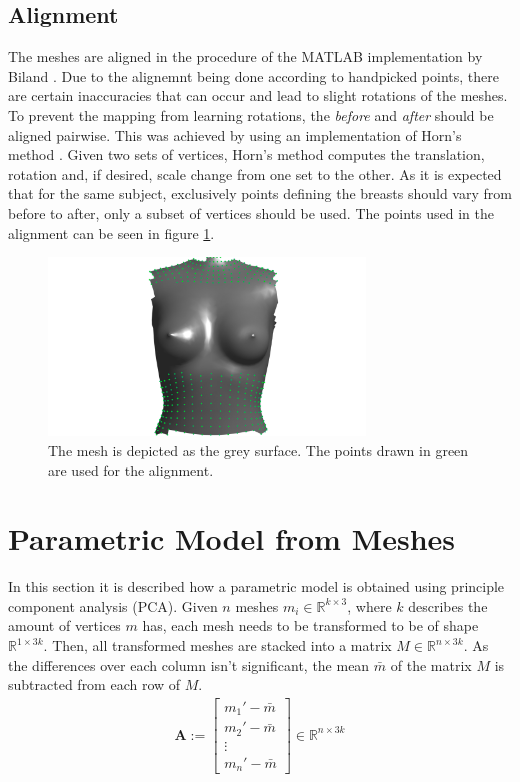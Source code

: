 \subsection{Alignment}
\label{align}
The meshes are aligned in the procedure of the MATLAB implementation by Biland \cite{Biland17}. Due to the alignemnt being done according to handpicked points, there are certain inaccuracies that can occur and lead to slight rotations of the meshes. To prevent the mapping from learning rotations, the \textit{before} and \textit{after} should be aligned pairwise. This was achieved by using an implementation of Horn's method \cite{horn1987closed}. Given two sets of vertices, Horn's method computes the translation, rotation and, if desired, scale change from one set to the other. As it is expected that for the same subject, exclusively points defining the breasts should vary from before to after, only a subset of vertices should be used. The points used in the alignment can be seen in figure \ref{fig:alignment}.

\begin{figure}[h]
\centering
\includegraphics[width=0.75\textwidth]{figures/alignment}
\caption[Alignment points visualized]{The mesh is depicted as the grey surface. The points drawn in green are used for the alignment.}
\label{fig:alignment}
\end{figure}

\section{Parametric Model from Meshes}
\label{paramModel}
In this section it is described how a parametric model is obtained using principle component analysis (PCA). Given $n$ meshes $m_i \in \mathbb{R}^{k \times 3}$, where $k$ describes the amount of vertices $m$ has, each mesh needs to be transformed to be of shape $\mathbb{R}^{1 \times 3k}$. Then, all transformed meshes are stacked into a matrix $M \in \mathbb{R}^{n \times 3k}$. As the differences over each column isn't significant, the mean $\bar{m}$ of the matrix $M$ is subtracted from each row of $M$.
\begin{gather}
\mathbf{A} :=
\begin{bmatrix}
 m_1' - \bar{m} \\
 m_2' - \bar{m} \\
 \vdots \\
 m_n' - \bar{m}
\end{bmatrix}
\in \mathbb{R}^{n \times 3k}
\end{gather}

